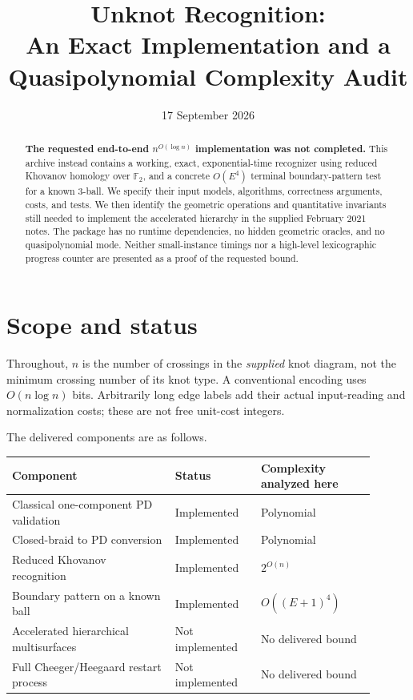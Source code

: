 \documentclass[11pt]{article}
\title{Unknot Recognition:\\An Exact Implementation and a\\Quasipolynomial Complexity Audit}
\author{}
\date{17 September 2026}
\theoremstyle{definition}\newtheorem{definition}[theorem]{Definition}
\newcommand{\F}{\mathbb F_2}
\begin{document}
\maketitle
\begin{abstract}
\noindent\textbf{The requested end-to-end $n^{O(\log n)}$ implementation was not
completed.} This archive instead contains a working, exact, exponential-time
recognizer using reduced Khovanov homology over $\F$, and a concrete
$O(E^4)$ terminal boundary-pattern test for a known 3-ball. We specify their
input models, algorithms, correctness arguments, costs, and tests. We then
identify the geometric operations and quantitative invariants still needed to
implement the accelerated hierarchy in the supplied February 2021 notes.
The package has no runtime dependencies, no hidden geometric oracles, and no
quasipolynomial mode. Neither small-instance timings nor a high-level
lexicographic progress counter are presented as a proof of the requested bound.
\end{abstract}
\setcounter{tocdepth}{1}
\tableofcontents
\newpage

\section{Scope and status}

Throughout, $n$ is the number of crossings in the \emph{supplied} knot diagram,
not the minimum crossing number of its knot type. A conventional encoding uses
$O(n\log n)$ bits. Arbitrarily long edge labels add their actual input-reading
and normalization costs; these are not free unit-cost integers.

The delivered components are as follows.
\begin{center}
\begin{tabular}{@{}p{0.40\linewidth}p{0.21\linewidth}p{0.29\linewidth}@{}}
\toprule
Component & Status & Complexity analyzed here\\
\midrule
Classical one-component PD validation & Implemented & Polynomial\\
Closed-braid to PD conversion & Implemented & Polynomial\\
Reduced Khovanov recognition & Implemented & $2^{O(n)}$\\
Boundary pattern on a known ball & Implemented & $O((E+1)^4)$\\
Accelerated hierarchical multisurfaces & Not implemented & No delivered bound\\
Full Cheeger/Heegaard restart process & Not implemented & No delivered bound\\
\bottomrule
\end{tabular}
\end{center}
\end{document}
